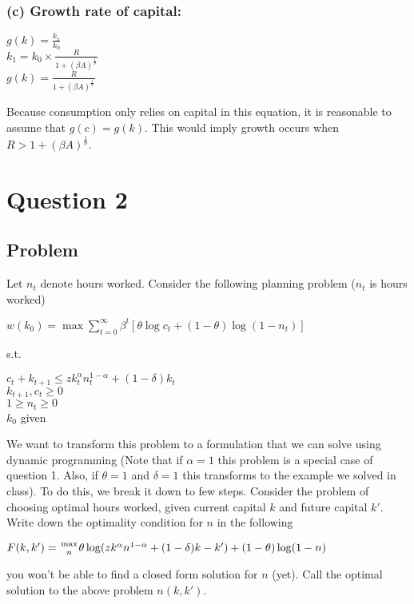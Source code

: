\documentclass[10pt, a4paper]{article}
\begin{document}
    \subsubsection{(c) Growth rate of capital:}
    \begin{center}
      $g(k) = \frac{k_1}{k_0}$ \\
      $k_1 = k_0\times\frac{R}{1+(\beta A)^{\frac{1}{\sigma}}}$ \\
      $\boxed{g(k) = \frac{R}{1+(\beta A)^{\frac{1}{\sigma}}}}$ \\
    \end{center}
    Because consumption only relies on capital in this equation, it is reasonable to assume that $g(c)=g(k)$. This would imply growth occurs when $R>1+(\beta A)^{\frac{1}{\sigma}}$.
\section*{Question 2}
  \subsection*{Problem}
    Let $n_t$ denote hours worked. Consider the following planning problem ($n_t$ is hours worked)
    \begin{center}
      $w(k_0) = \max\sum_{t=0}^{\infty}\beta^t[\theta\log c_t+(1-\theta)\log(1-n_t)]$
    \end{center}
    s.t.
    \begin{center}
      $c_t+k_{t+1}\leq zk_t^{\alpha}n_t^{1-\alpha}+(1-\delta)k_t$ \\
      $k_{t+1},c_t\geq 0$ \\
      $1\geq n_t\geq 0$ \\
      $k_0$ given
    \end{center}

    We want to transform this problem to a formulation that we can solve using dynamic programming (Note that if $\alpha=1$ this problem is a special case of question 1. Also, if $\theta=1$ and $\delta=1$ this transforms to the example we solved in class). To do this, we break it down to few steps. Consider the problem of choosing optimal hours worked, given current capital $k$ and future capital $k'$. Write down the optimality condition for $n$ in the following
    \begin{center}
      $F(k,k')={\max\atop{n}}\theta\log(zk^{\alpha}n^{1-\alpha}+(1-\delta)k-k')+(1-\theta)\log(1-n)$
    \end{center}
    you won't be able to find a closed form solution for $n$ (yet). Call the optimal solution to the above problem $n(k,k')$.
\end{document}
